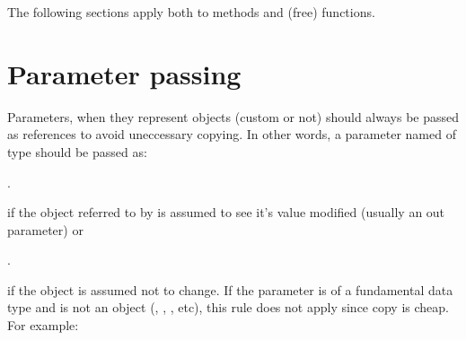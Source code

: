 %
%

%
%
%
%

The following sections apply both to methods and (free) functions.

\section{Parameter passing}
Parameters, when they represent objects (custom or not) should always be passed 
as references to avoid uneccessary copying. In other words, a parameter named 
 of type  should be passed as:

\begin{center}
.
\end{center}

if the object referred to by  is assumed to see it's value 
modified (usually an out parameter) or

\begin{center}
.
\end{center}

if the object is assumed not to change. If the parameter is of a fundamental 
data type and is not an object (, , , etc), 
this rule does not apply since copy is cheap. For example:

